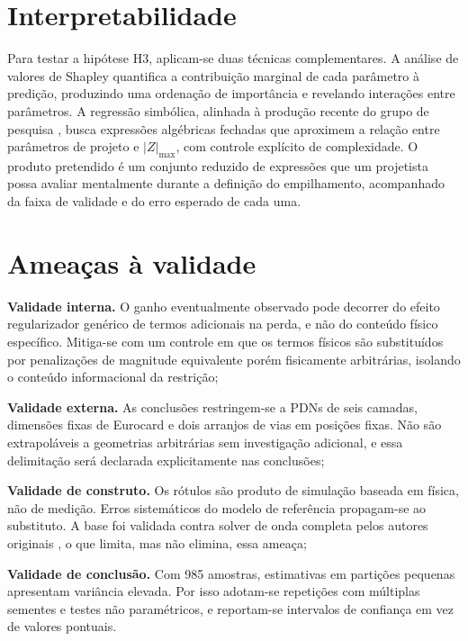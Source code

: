 \section{Interpretabilidade}
\label{sec:interpretabilidade}

Para testar a hipótese H3, aplicam-se duas técnicas complementares. A análise de
valores de Shapley \citep{lundberg2017} quantifica a contribuição marginal de
cada parâmetro à predição, produzindo uma ordenação de importância e revelando
interações entre parâmetros. A regressão simbólica, alinhada à produção recente
do grupo de pesquisa \citep{tessaro2026}, busca expressões algébricas fechadas
que aproximem a relação entre parâmetros de projeto e $|Z|_{\max}$, com controle
explícito de complexidade. O produto pretendido é um conjunto reduzido de
expressões que um projetista possa avaliar mentalmente durante a definição do
empilhamento, acompanhado da faixa de validade e do erro esperado de cada uma.

\section{Ameaças à validade}
\label{sec:ameacas}

\begin{alineas}
\item \textbf{Validade interna.} O ganho eventualmente observado pode decorrer do
efeito regularizador genérico de termos adicionais na perda, e não do conteúdo
físico específico. Mitiga-se com um controle em que os termos físicos são
substituídos por penalizações de magnitude equivalente porém fisicamente
arbitrárias, isolando o conteúdo informacional da restrição;

\item \textbf{Validade externa.} As conclusões restringem-se a PDNs de seis
camadas, dimensões fixas de Eurocard e dois arranjos de vias em posições fixas.
Não são extrapoláveis a geometrias arbitrárias sem investigação adicional, e essa
delimitação será declarada explicitamente nas conclusões;

\item \textbf{Validade de construto.} Os rótulos são produto de simulação
baseada em física, não de medição. Erros sistemáticos do modelo de referência
propagam-se ao substituto. A base foi validada contra solver de onda completa
pelos autores originais \citep{schierholz2021}, o que limita, mas não elimina,
essa ameaça;

\item \textbf{Validade de conclusão.} Com 985 amostras, estimativas em partições
pequenas apresentam variância elevada. Por isso adotam-se repetições com
múltiplas sementes e testes não paramétricos, e reportam-se intervalos de
confiança em vez de valores pontuais.
\end{alineas}
